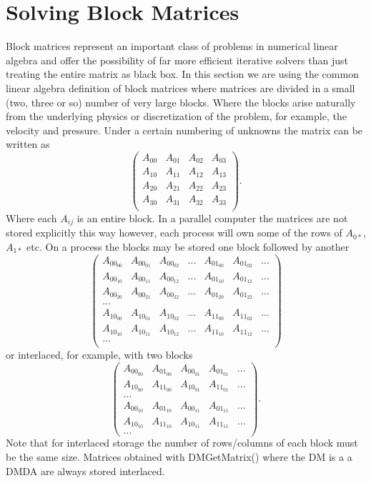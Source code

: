 \section{Solving Block Matrices}
\label{sec_block_matrices}

Block matrices represent an important class of problems in numerical
linear algebra and offer the possibility of far more efficient
iterative solvers than just treating the entire matrix as black box. In
this section we are using the common linear algebra definition of
block matrices where matrices are divided in a small (two, three or
so) number of very large blocks. Where the blocks arise naturally from
the underlying physics or discretization of the problem, for example, the velocity and pressure. Under a
certain numbering of unknowns the matrix can be written as
\[
\left( \begin{array}{cccc}
A_{00}   & A_{01} & A_{02} & A_{03} \\
A_{10}   & A_{11} & A_{12} & A_{13} \\
A_{20}   & A_{21} & A_{22} & A_{23} \\
A_{30}   & A_{31} & A_{32} & A_{33} \\
\end{array} \right).
\]
Where each $ A_{ij}$ is an entire block.
In a parallel computer the matrices are not stored explicitly this way
however, each process will own some of the rows of $A_{0*}$, $A_{1*}$
etc. On a process the blocks may be stored one block followed by another
\[
\left( \begin{array}{ccccccc}
A_{{00}_{00}}   & A_{{00}_{01}} & A_{{00}_{02}} & ... & A_{{01}_{00}} & A_{{01}_{02}} & ...  \\
A_{{00}_{10}}   & A_{{00}_{11}} & A_{{00}_{12}} & ... & A_{{01}_{10}} & A_{{01}_{12}} & ... \\
A_{{00}_{20}}   & A_{{00}_{21}} & A_{{00}_{22}} & ... & A_{{01}_{20}} & A_{{01}_{22}}  & ...\\
... \\
A_{{10}_{00}}   & A_{{10}_{01}} & A_{{10}_{02}} & ... & A_{{11}_{00}} & A_{{11}_{02}}  & ... \\
A_{{10}_{10}}   & A_{{10}_{11}} & A_{{10}_{12}} & ... & A_{{11}_{10}} & A_{{11}_{12}}  & ... \\
... \\
\end{array} \right)
\]
or interlaced, for example, with two blocks 
\[
\left( \begin{array}{ccccc}
A_{{00}_{00}}   & A_{{01}_{00}} &  A_{{00}_{01}} & A_{{01}_{01}} &  ... \\
A_{{10}_{00}}   & A_{{11}_{00}} &  A_{{10}_{01}} & A_{{11}_{01}} &  ... \\
... \\
A_{{00}_{10}}   & A_{{01}_{10}} & A_{{00}_{11}} & A_{{01}_{11}} & ...\\
A_{{10}_{10}}   & A_{{11}_{10}} & A_{{10}_{11}} & A_{{11}_{11}} & ...\\
...
\end{array} \right).
\]
Note that for interlaced storage the number of rows/columns of each
block must be the same size. Matrices obtained with DMGetMatrix()
where the DM is a a DMDA are always stored interlaced.


